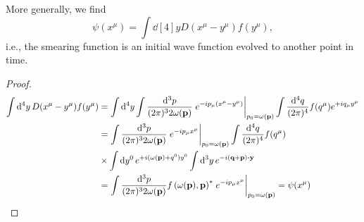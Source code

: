 \begin{lemma}
	More generally, we find
	\begin{equation}
		\psi(x^\mu)
		=
		\int\dd[4]{y}
		D(x^\mu-y^\mu)
		f(y^\mu)
		,
	\end{equation}
	i.e., the smearing function is an initial wave function evolved to another point in time.
\end{lemma}
\begin{proof}
	\begin{equation*}
		\begin{split}
			\int\dd[4]{y}
			D(x^\mu-y^\mu)
			f(y^\mu)
			&=
			\int\dd[4]{y}
			\int\frac{\dd[3]{p}}{(2\pi)^32\omega(\vb{p})}
			\eval{e^{-ip_\mu(x^\mu-y^\mu)}}_{p_0=\omega(\vb{p})}
			\int\frac{\dd[4]{q}}{(2\pi)^4}
			f(q^\mu)
			e^{+iq_\mu y^\mu}
			\\
			&=
			\int\frac{\dd[3]{p}}{(2\pi)^32\omega(\vb{p})}
			\eval{e^{-ip_\mu x^\mu}}_{p_0=\omega(\vb{p})}
			\int\frac{\dd[4]{q}}{(2\pi)^4}
			f(q^\mu)
			\\
			&\times
			\int\dd{y^0}
			e^{+i(\omega(\vb{p})+q^0)y^0}
			\int\dd[3]{y}
			e^{-i(\vb{q}+\vb{p})\vdot\vb{y}}
			\\
			&=
			\int\frac{\dd[3]{p}}{(2\pi)^32\omega(\vb{p})}
			f\left(\omega(\vb{p}),\vb{p}\right)^*
			\eval{e^{-ip_\mu x^\mu}}_{p_0=\omega(\vb{p})}
			=
			\psi(x^\mu)
		\end{split}
	\end{equation*}
\end{proof}
